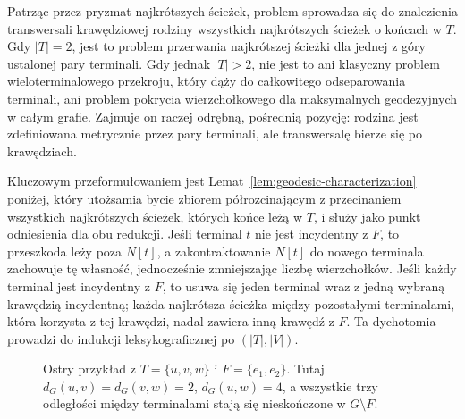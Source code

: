 \documentclass[11pt,a4paper]{amsart}
\theoremstyle{definition}
\theoremstyle{plain}
\newcommand{\dist}[3]{d_{#1}(#2,#3)}
\begin{document}
Patrząc przez pryzmat najkrótszych ścieżek, problem sprowadza się do znalezienia transwersali krawędziowej rodziny wszystkich najkrótszych ścieżek o końcach w $T$.
Gdy $|T|=2$, jest to problem przerwania najkrótszej ścieżki dla jednej z góry ustalonej pary terminali. Gdy jednak $|T|>2$, nie jest to ani klasyczny problem wieloterminalowego przekroju, który dąży do całkowitego odseparowania terminali, ani problem pokrycia wierzchołkowego dla maksymalnych geodezyjnych w całym grafie. Zajmuje on raczej odrębną, pośrednią pozycję: rodzina jest zdefiniowana metrycznie przez pary terminali, ale transwersalę bierze się po krawędziach.

Kluczowym przeformułowaniem jest Lemat~\ref{lem:geodesic-characterization} poniżej, który utożsamia bycie zbiorem półrozcinającym z przecinaniem wszystkich najkrótszych ścieżek, których końce leżą w $T$, i służy jako punkt odniesienia dla obu redukcji.
Jeśli terminal $t$ nie jest incydentny z $F$, to przeszkoda leży poza $N[t]$, a zakontraktowanie $N[t]$ do nowego terminala zachowuje tę własność, jednocześnie zmniejszając liczbę wierzchołków.
Jeśli każdy terminal jest incydentny z $F$, to usuwa się jeden terminal wraz z jedną wybraną krawędzią incydentną;
każda najkrótsza ścieżka między pozostałymi terminalami, która korzysta z tej krawędzi, nadal zawiera inną krawędź z $F$. Ta dychotomia prowadzi do indukcji leksykograficznej po $(|T|,|V|)$.

\begin{figure}[htbp]
\centering
{}
\caption{Ostry przykład z $T=\{u,v,w\}$ i $F=\{e_1,e_2\}$. Tutaj $\dist{G}{u}{v}=\dist{G}{v}{w}=2$, $\dist{G}{u}{w}=4$, a wszystkie trzy odległości między terminalami stają się nieskończone w $G\setminus F$.}
\label{fig:semi-cut-example}
\end{figure}
\end{document}
